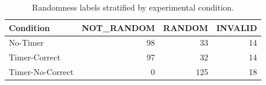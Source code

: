 \begin{table}[t]
\centering
\caption{Randomness labels stratified by experimental condition.}
\label{tab:label-by-condition}
\begin{tabular}{lrrr}
\hline
Condition & NOT\_RANDOM & RANDOM & INVALID \\ \hline
No-Timer & 98 & 33 & 14 \\ \hline
Timer-Correct & 97 & 32 & 14 \\ \hline
Timer-No-Correct & 0 & 125 & 18 \\ \hline
\end{tabular}
\end{table}
